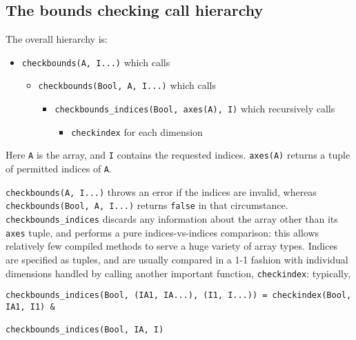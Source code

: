 \subsection{The bounds checking call hierarchy}



The overall hierarchy is:



\begin{itemize}
\item \texttt{checkbounds(A, I...)} which calls

\begin{itemize}
\item \texttt{checkbounds(Bool, A, I...)} which calls

\begin{itemize}
\item \texttt{checkbounds\_indices(Bool, axes(A), I)} which recursively calls

\begin{itemize}
\item \texttt{checkindex} for each dimension

\end{itemize}
\end{itemize}
\end{itemize}
\end{itemize}


Here \texttt{A} is the array, and \texttt{I} contains the {\textquotedbl}requested{\textquotedbl} indices. \texttt{axes(A)} returns a tuple of {\textquotedbl}permitted{\textquotedbl} indices of \texttt{A}.



\texttt{checkbounds(A, I...)} throws an error if the indices are invalid, whereas \texttt{checkbounds(Bool, A, I...)} returns \texttt{false} in that circumstance.  \texttt{checkbounds\_indices} discards any information about the array other than its \texttt{axes} tuple, and performs a pure indices-vs-indices comparison: this allows relatively few compiled methods to serve a huge variety of array types. Indices are specified as tuples, and are usually compared in a 1-1 fashion with individual dimensions handled by calling another important function, \texttt{checkindex}: typically,




\begin{verbatim}
checkbounds_indices(Bool, (IA1, IA...), (I1, I...)) = checkindex(Bool, IA1, I1) &
                                                      checkbounds_indices(Bool, IA, I)
\end{verbatim}




